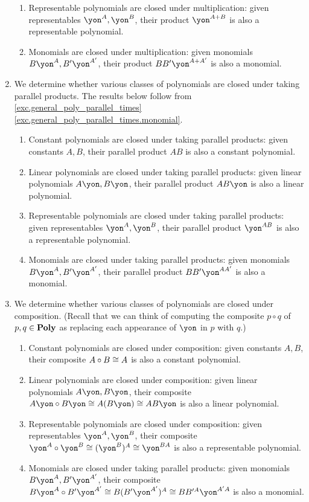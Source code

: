 \documentclass[Book-Poly]{subfiles}
\begin{document}
\begin{exercise}
\begin{solution}
\begin{enumerate}
\begin{enumerate}
        \item Representable polynomials are closed under multiplication: given representables $\yon^A, \yon^B$, their product $\yon^{A+B}$ is also a representable polynomial.
        \item Monomials are closed under multiplication: given monomials $B\yon^A, B'\yon^{A'}$, their product $BB'\yon^{A+A'}$ is also a monomial.
    \end{enumerate}
    \item We determine whether various classes of polynomials are closed under taking parallel products.
    The results below follow from \cref{exc.general_poly_parallel_times} \cref{exc.general_poly_parallel_times.monomial}.
    \begin{enumerate}
        \item Constant polynomials are closed under taking parallel products: given constants $A, B$, their parallel product $AB$ is also a constant polynomial.
        \item Linear polynomials are closed under taking parallel products: given linear polynomials $A\yon, B\yon$, their parallel product $AB\yon$ is also a linear polynomial.
        \item Representable polynomials are closed under taking parallel products: given representables $\yon^A, \yon^B$, their parallel product $\yon^{AB}$ is also a representable polynomial.
        \item Monomials are closed under taking parallel products: given monomials $B\yon^A, B'\yon^{A'}$, their parallel product $BB'\yon^{AA'}$ is also a monomial.
    \end{enumerate}
    \item We determine whether various classes of polynomials are closed under composition. (Recall that we can think of computing the composite $p \circ q$ of $p, q \in \mathbf{Poly}$ as replacing each appearance of $\yon$ in $p$ with $q$.)
    \begin{enumerate}
        \item Constant polynomials are closed under composition: given constants $A, B$, their composite $A \circ B \cong A$ is also a constant polynomial.
        \item Linear polynomials are closed under composition: given linear polynomials $A\yon, B\yon$, their composite $A\yon \circ B\yon \iso A(B\yon) \iso AB\yon$ is also a linear polynomial.
        \item Representable polynomials are closed under composition: given representables $\yon^A, \yon^B$, their composite $\yon^A \circ \yon^B \iso (\yon^B)^A \iso \yon^{BA}$ is also a representable polynomial.
        \item Monomials are closed under taking parallel products: given monomials $B\yon^A, B'\yon^{A'}$, their composite $B\yon^A \circ B'\yon^{A'} \iso B(B'\yon^{A'})^A \iso BB'^A\yon^{A'A}$ is also a monomial.
    \end{enumerate}
\end{enumerate}
\end{solution}
\end{exercise}
\end{document}
